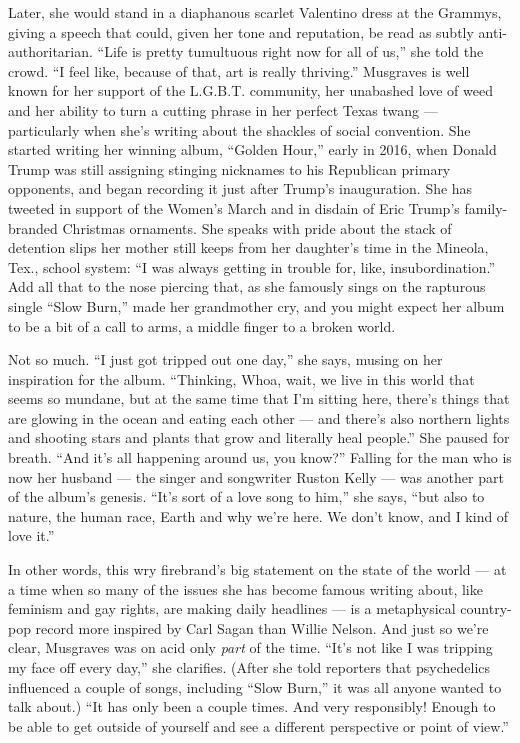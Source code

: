 Later, she would stand in a diaphanous scarlet Valentino dress at the
Grammys, giving a speech that could, given her tone and reputation, be
read as subtly anti-authoritarian. ``Life is pretty tumultuous right now
for all of us,'' she told the crowd. ``I feel like, because of that, art
is really thriving.'' Musgraves is well known for her support of the
L.G.B.T. community, her unabashed love of weed and her ability to turn a
cutting phrase in her perfect Texas twang --- particularly when she's
writing about the shackles of social convention. She started writing her
winning album, ``Golden Hour,'' early in 2016, when Donald Trump was
still assigning stinging nicknames to his Republican primary opponents,
and began recording it just after Trump's inauguration. She has tweeted
in support of the Women's March and in disdain of Eric Trump's
family-branded Christmas ornaments. She speaks with pride about the
stack of detention slips her mother still keeps from her daughter's time
in the Mineola, Tex., school system: ``I was always getting in trouble
for, like, insubordination.'' Add all that to the nose piercing that, as
she famously sings on the rapturous single ``Slow Burn,'' made her
grandmother cry, and you might expect her album to be a bit of a call to
arms, a middle finger to a broken world.

Not so much. ``I just got tripped out one day,'' she says, musing on her
inspiration for the album. ``Thinking, Whoa, wait, we live in this world
that seems so mundane, but at the same time that I'm sitting here,
there's things that are glowing in the ocean and eating each other ---
and there's also northern lights and shooting stars and plants that grow
and literally heal people.'' She paused for breath. ``And it's all
happening around us, you know?'' Falling for the man who is now her
husband --- the singer and songwriter Ruston Kelly --- was another part
of the album's genesis. ``It's sort of a love song to him,'' she says,
``but also to nature, the human race, Earth and why we're here. We don't
know, and I kind of love it.''

In other words, this wry firebrand's big statement on the state of the
world --- at a time when so many of the issues she has become famous
writing about, like feminism and gay rights, are making daily headlines
--- is a metaphysical country-pop record more inspired by Carl Sagan
than Willie Nelson. And just so we're clear, Musgraves was on acid only
\emph{part} of the time. ``It's not like I was tripping my face off
every day,'' she clarifies. (After she told reporters that psychedelics
influenced a couple of songs, including ``Slow Burn,'' it was all anyone
wanted to talk about.) ``It has only been a couple times. And very
responsibly! Enough to be able to get outside of yourself and see a
different perspective or point of view.''

